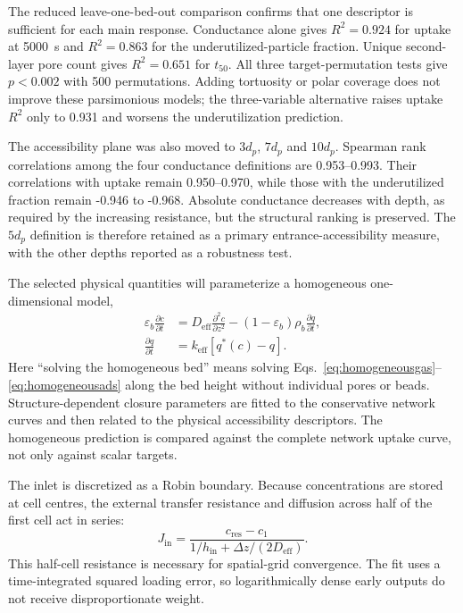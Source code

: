 \documentclass[12pt,a4paper]{article}
\begin{document}
The reduced leave-one-bed-out comparison confirms that one descriptor is
sufficient for each main response. Conductance alone gives $R^2=0.924$ for
uptake at 5000~s and $R^2=0.863$ for the underutilized-particle fraction.
Unique second-layer pore count gives $R^2=0.651$ for $t_{50}$. All three
target-permutation tests give $p<0.002$ with 500 permutations. Adding
tortuosity or polar coverage does not improve these parsimonious models; the
three-variable alternative raises uptake $R^2$ only to 0.931 and worsens the
underutilization prediction.

The accessibility plane was also moved to $3d_p$, $7d_p$ and $10d_p$.
Spearman rank correlations among the four conductance definitions are
0.953--0.993. Their correlations with uptake remain 0.950--0.970, while those
with the underutilized fraction remain -0.946 to -0.968. Absolute conductance
decreases with depth, as required by the increasing resistance, but the
structural ranking is preserved. The $5d_p$ definition is therefore retained
as a primary entrance-accessibility measure, with the other depths reported as
a robustness test.

The selected physical quantities will parameterize a homogeneous
one-dimensional model,
\begin{align}
 \varepsilon_b\frac{\partial c}{\partial t}
 &=D_{\mathrm{eff}}
 \frac{\partial^2c}{\partial z^2}
 -(1-\varepsilon_b)\rho_b\frac{\partial q}{\partial t},
 \label{eq:homogeneousgas}\\
 \frac{\partial q}{\partial t}
 &=k_{\mathrm{eff}}
 [q^*(c)-q].
 \label{eq:homogeneousads}
\end{align}
Here ``solving the homogeneous bed'' means solving
Eqs.~\eqref{eq:homogeneousgas}--\eqref{eq:homogeneousads} along the bed height
without individual pores or beads. Structure-dependent closure parameters are fitted to the conservative
network curves and then related to the physical accessibility descriptors. The
homogeneous prediction is compared against the complete network uptake curve,
not only against scalar targets.

The inlet is discretized as a Robin boundary. Because concentrations are stored
at cell centres, the external transfer resistance and diffusion across half of
the first cell act in series:
\begin{equation}
 J_{\mathrm{in}}=
 \frac{c_{\mathrm{res}}-c_1}
 {1/h_{\mathrm{in}}+\Delta z/(2D_{\mathrm{eff}})}.
 \label{eq:homogeneous-robin}
\end{equation}
This half-cell resistance is necessary for spatial-grid convergence. The fit
uses a time-integrated squared loading error, so logarithmically dense early
outputs do not receive disproportionate weight.
\end{document}
